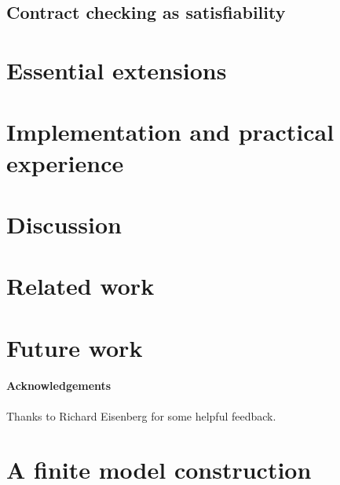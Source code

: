 \documentclass[preprint,nocopyrightspace,draft]{sigplanconf}
\begin{document}
\subsection{Contract checking as satisfiability}\label{sect:soundness}
  

\section{Essential extensions}\label{sect:extensions}
  

\section{Implementation and practical experience}\label{sect:implementation}
  

\section{Discussion}\label{sect:discussion}
  

\section{Related work}\label{sect:related}
   


\section{Future work}\label{sect:future}
  

\paragraph{Acknowledgements}
Thanks to Richard Eisenberg for some helpful feedback.




\appendix 

\section{A finite model construction}\label{sect:finite-model-proof}

\end{document}
